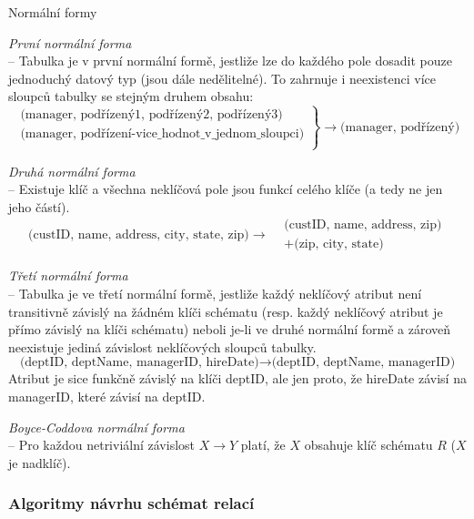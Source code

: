 \begin{definiceN}{Normální formy}
\begin{pitemize}
	\item \emph{První normální forma} \\ -- Tabulka je v první normální formě, jestliže lze do každého pole dosadit pouze jednoduchý datový typ (jsou dále nedělitelné). To zahrnuje i neexistenci více sloupců tabulky se stejným druhem obsahu:
$$
\left.\begin{aligned}
\textrm{(manager, podřízený1, podřízený2, podřízený3)} \\ 
\textrm{(manager, podřízení-vice\_hodnot\_v\_jednom\_sloupci)} \\
\end{aligned}\right\} \rightarrow \textrm{(manager, podřízený)}
$$
	\item \emph{Druhá normální forma} \\ 
-- Existuje klíč a všechna neklíčová pole jsou funkcí celého klíče (a tedy ne jen jeho částí). 
$$\textrm{(custID, name, address, city, state, zip)} \rightarrow
\begin{aligned}&\textrm{(custID, name, address, zip)}\\
&+ \textrm{(zip, city, state)}
\end{aligned}$$
	\item \emph{Třetí normální forma} \\ -- Tabulka je ve třetí normální formě, jestliže každý neklíčový atribut není transitivně závislý na žádném klíči schématu (resp. každý neklíčový atribut je přímo závislý na klíči schématu) neboli je-li ve druhé normální formě a zároveň neexistuje jediná závislost neklíčových sloupců tabulky. 
$$\textrm{(deptID, deptName, managerID, hireDate)} \rightarrow \textrm{(deptID, deptName, managerID)}$$
Atribut  je sice funkčně závislý na klíči deptID, ale jen proto, že hireDate závisí na managerID, které závisí na deptID.
	\item \emph{Boyce-Coddova normální forma}\\ -- Pro každou netriviální závislost $X \rightarrow Y$ platí, že $X$ obsahuje klíč schématu $R$ ($X$ je nadklíč).
\end{pitemize}
\end{definiceN}

\subsubsection*{Algoritmy návrhu schémat relací}

